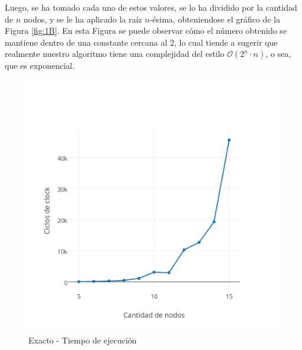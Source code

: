 Luego, se ha tomado cada uno de estos valores, se lo ha dividido por la cantidad de $n$ nodos, y se le ha aplicado la raíz $n$-ésima, obteniendose el gráfico de la Figura \ref{fig:1B}. En esta Figura se puede observar cómo el número obtenido se mantiene dentro de una constante cercana al 2, lo cual tiende a sugerir que realmente nuestro algoritmo tiene una complejidad del estilo $\mathcal{O}(2^n \cdot n)$, o sea, que es exponencial.

\begin{figure}[!htb]
\begin{center}
  \includegraphics[scale=0.7]{imagenes/exacto-tiempo.png}
\end{center}
  \caption{Exacto - Tiempo de ejecución}\label{fig:1A}
\endminipage\hfill
{}
\begin{center}

\end{center}
\end{figure}
